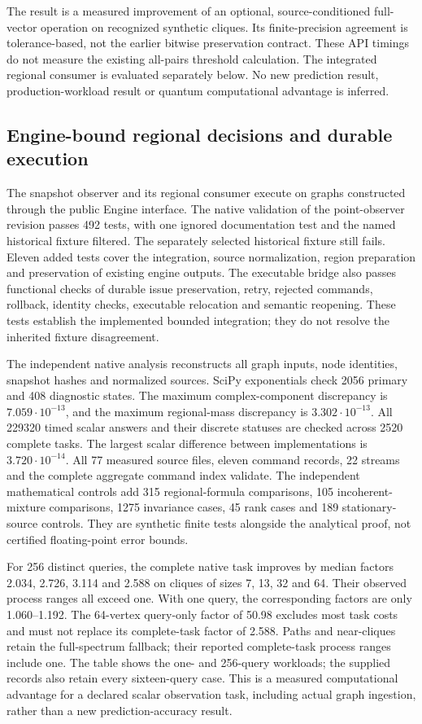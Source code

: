 \documentclass[11pt,a4paper]{article}
\theoremstyle{definition}\newtheorem{definition}[theorem]{Definition}
\begin{document}
The result is a measured improvement of an optional, source-conditioned
full-vector operation on recognized synthetic cliques. Its finite-precision
agreement is tolerance-based, not the earlier bitwise preservation contract.
These API timings do not measure the existing all-pairs threshold calculation.
The integrated regional consumer is evaluated separately below. No new
prediction result, production-workload result or quantum computational
advantage is inferred.

\subsection{Engine-bound regional decisions and durable execution}\label{sec:engineobserverresults}
The snapshot observer and its regional consumer execute on graphs constructed
through the public Engine interface. The native validation of the point-observer revision passes
492 tests, with one ignored documentation test and the named historical
fixture filtered. The separately selected historical fixture still fails.
Eleven added tests cover the integration, source normalization, region
preparation and preservation of existing engine outputs. The executable bridge
also passes functional checks of durable issue preservation, retry, rejected
commands, rollback, identity checks, executable relocation and semantic
reopening. These tests establish the implemented bounded integration; they do
not resolve the inherited fixture disagreement.

The independent native analysis reconstructs all graph inputs, node identities,
snapshot hashes and normalized sources. SciPy exponentials check 2056 primary
and 408 diagnostic states. The maximum complex-component discrepancy is
$7.059\cdot10^{-13}$, and the maximum regional-mass discrepancy is
$3.302\cdot10^{-13}$. All 229320 timed scalar answers and their discrete statuses
are checked across 2520 complete tasks. The largest scalar difference between
implementations is $3.720\cdot10^{-14}$. All 77 measured source files, eleven
command records, 22 streams and the complete aggregate command index validate.
The independent mathematical controls add 315 regional-formula comparisons,
105 incoherent-mixture comparisons, 1275 invariance cases, 45 rank cases and
189 stationary-source controls. They are synthetic finite tests alongside the
analytical proof, not certified floating-point error bounds.

For 256 distinct queries, the complete native task improves by median factors
2.034, 2.726, 3.114 and 2.588 on cliques of sizes 7, 13, 32 and 64. Their
observed process ranges all exceed one. With one query, the corresponding
factors are only 1.060--1.192. The 64-vertex query-only factor of 50.98 excludes
most task costs and must not replace its complete-task factor of 2.588.
Paths and near-cliques retain the full-spectrum fallback; their reported
complete-task process ranges include one. The table shows the one- and
256-query workloads; the supplied records also retain every sixteen-query
case. This is a measured computational advantage for a declared scalar
observation task, including actual graph ingestion, rather than a new
prediction-accuracy result.

\end{document}
